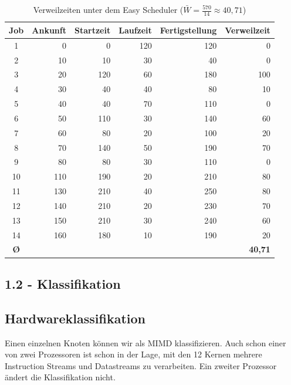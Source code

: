 \begin{table}[H]
  \centering
  \begin{tabular}{|c|r|r|r|r|r|}
    \hline
    \textbf{Job} & \textbf{Ankunft} & \textbf{Startzeit} & \textbf{Laufzeit} & \textbf{Fertigstellung} & \textbf{Verweilzeit} \\
    \hline
    1  &   0 &   0 & 120 & 120 &   0 \\
    2  &  10 &  10 &  30 &  40 &   0 \\
    3  &  20 & 120 &  60 & 180 & 100 \\
    4  &  30 &  40 &  40 &  80 &  10 \\
    5  &  40 &  40 &  70 & 110 &   0 \\
    6  &  50 & 110 &  30 & 140 &  60 \\
    7  &  60 &  80 &  20 & 100 &  20 \\
    8  &  70 & 140 &  50 & 190 &  70 \\
    9  &  80 &  80 &  30 & 110 &   0 \\
    10 & 110 & 190 &  20 & 210 &  80 \\
    11 & 130 & 210 &  40 & 250 &  80 \\
    12 & 140 & 210 &  20 & 230 &  70 \\
    13 & 150 & 210 &  30 & 240 &  60 \\
    14 & 160 & 180 &  10 & 190 &  20 \\
    \hline
    \textbf{Ø} & & & & & \textbf{40,71} \\
    \hline
  \end{tabular}
  \caption{Verweilzeiten unter dem Easy Scheduler ($\bar{W} = \tfrac{570}{14} \approx 40{,}71$)}
  \label{tab:easyVerweilzeit}
\end{table}

\subsection*{1.2 - Klassifikation}

\subsection*{Hardwareklassifikation}

Einen einzelnen Knoten können wir als MIMD klassifizieren. Auch schon einer von zwei Prozessoren ist schon in der Lage, mit den 12 Kernen mehrere Instruction Streams und Datastreams zu verarbeiten. Ein zweiter Prozessor ändert die Klassifikation nicht.

